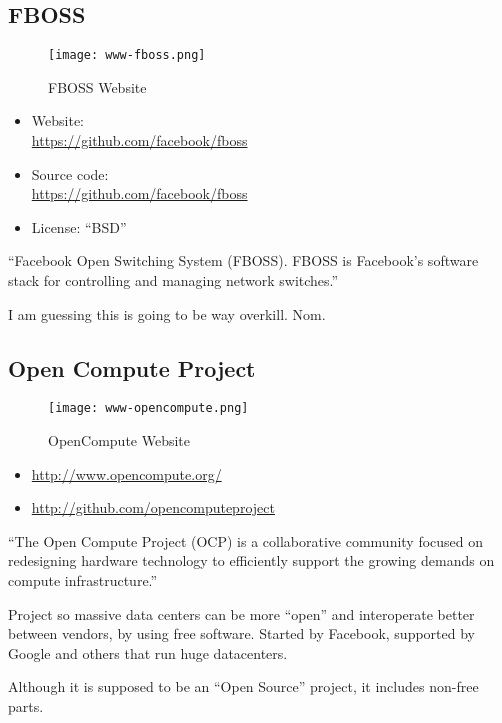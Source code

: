 \subsection{FBOSS}
\begin{figure}[h!]
\texttt{[image: www-fboss.png]}
 \caption{FBOSS Website}
 \label{fig:www-fboss}
\end{figure}


\begin{itemize}
 \item Website: \\ \url{https://github.com/facebook/fboss}
 \item Source code: \\ \url{https://github.com/facebook/fboss}
 \item License: ``BSD''
\end{itemize}


``Facebook Open Switching System (FBOSS).
FBOSS is Facebook's software stack for controlling and managing network switches.''


I am guessing this is going to be way overkill. Nom.


\subsection{Open Compute Project}
\begin{figure}[h!]
\texttt{[image: www-opencompute.png]}
 \caption{OpenCompute Website}
 \label{fig:www-opencompute}
\end{figure}


\begin{itemize}
 \item \url{http://www.opencompute.org/}
 \item \url{http://github.com/opencomputeproject}
\end{itemize}

``The Open Compute Project (OCP) is a collaborative community focused on redesigning hardware technology to efficiently support the growing demands on compute infrastructure.''


Project so massive data centers can be more ``open'' and interoperate better
between vendors, by using free software. Started by Facebook, supported by
Google and others that run huge datacenters.


Although it is supposed to be an ``Open Source'' project, it includes non-free
parts.


